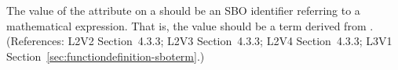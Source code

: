 The value of the  attribute on a \FunctionDefinition should be an
SBO identifier referring to a mathematical expression.  That is, the value
should be a term derived from \sbomathformula.  (References: L2V2 Section~4.3.3;
L2V3 Section~4.3.3; L2V4 Section~4.3.3; L3V1 Section~\ref{sec:functiondefinition-sboterm}.)
